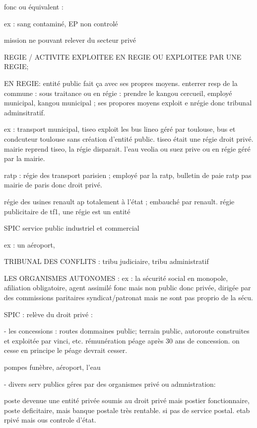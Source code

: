 \documentclass[a4paper,12pt]{article}
\begin{document}
fonc ou équivalent : 

ex : sang contaminé, EP non controlé   

mission ne pouvant relever du secteur privé

REGIE / ACTIVITE EXPLOITEE EN REGIE OU EXPLOITEE PAR UNE REGIE;

EN REGIE: entité public fait ça avec ses propres moyens.
enterrer resp de la commune : sous traitance ou en régie : prendre le kangou cercueil, employé municipal,
kangou municipal ; ses propores moyens exploit e nrégie donc tribunal adminsitratif.

ex : transport municipal, tiseo exploit les bus lineo géré par toulouse, bus et condcuteur toulouse sans création d'entité public. tiseo était une régie droit privé. mairie reprend tiseo, la régie disparait.
l'eau veolia ou suez prive ou en régie géré par la mairie.



ratp : régie des transport parisien ; employé par la ratp, bulletin de paie ratp pas mairie de paris donc droit privé.

régie des usines renault ap totalement à l'état ; embauché par renault.
régie publicitaire de tf1, une régie est un entité 

SPIC service public industriel et commercial

ex : un aéroport, 

TRIBUNAL DES CONFLITS : tribu judiciaire, tribu administratif



LES ORGANISMES AUTONOMES :
ex : la sécurité social en monopole, afiliation obligatoire, agent assimilé fonc mais non public donc privée, dirigée par des commissions paritaires syndicat/patronat mais ne sont pas proprio de la sécu.


SPIC : relève du droit privé :

- les concessions : 
routes dommaines public;
terrain public, autoroute construites et exploitée par vinci, etc. rémunération péage après 30 ans de concession.
on cesse en principe le péage devrait cesser.

pompes funèbre, aéroport, l'eau


- divers serv publics géres par des organismes privé ou admnistration:

poste devenue une entité privée soumis au droit privé mais postier fonctionnaire,
poste deficitaire, mais banque postale très rentable. si pas de service postal.
etab rpivé mais ous controle d'état.
\end{document}
